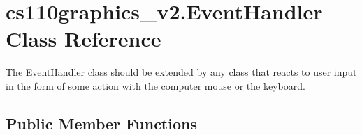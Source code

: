 \hypertarget{classcs110graphics__v2_1_1EventHandler}{}\section{cs110graphics\+\_\+v2.\+Event\+Handler Class Reference}
\label{classcs110graphics__v2_1_1EventHandler}


The \mbox{\hyperlink{classcs110graphics__v2_1_1EventHandler}{Event\+Handler}} class should be extended by any class that reacts to user input in the form of some action with the computer mouse or the keyboard.  


\subsection*{Public Member Functions}
